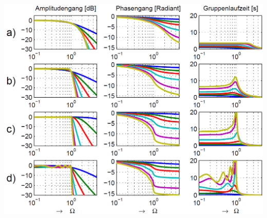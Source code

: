 \begin{minipage}[c]{0.7\columnwidth}
    \includegraphics[width=\columnwidth]{images/filter_vergleich_frequenzgaenge.png}
\end{minipage}
\hfill
